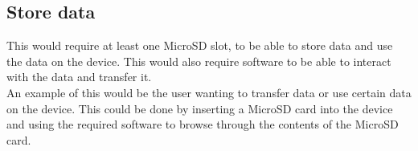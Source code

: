 \subsection{Store data}
	This would require at least one MicroSD slot, to be able to store data and use the data on the device. This would also require software to be able to interact with the data and transfer it.\\
	An example of this would be the user wanting to transfer data or use certain data on the device. This could be done by inserting a MicroSD card into the device and using the required software to browse through the contents of the MicroSD card.









